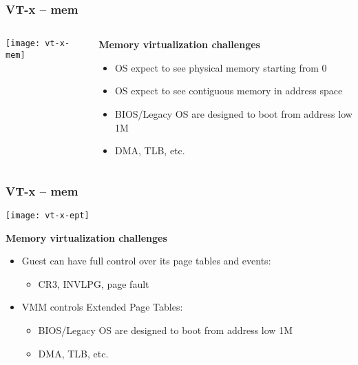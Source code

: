 \begin{frame}[plain]
	\frametitle{VT-x -- mem}
	
	
	
	\begin{columns}
		
		\begin{column}{.5\textwidth}
			
			\texttt{[image: vt-x-mem]}
			
		\end{column}
		
		\begin{column}{.5\textwidth}
			
			\textbf{Memory virtualization challenges}
			
			
			\begin{itemize}
				\item OS expect to see physical memory starting from 0
				\item OS expect to see contiguous memory in address space
				\item BIOS/Legacy OS are designed to boot from address low 1M
				\item DMA, TLB, etc.
			\end{itemize} 
			
			
			
		\end{column}
		
		
	\end{columns}
	
	
\end{frame}

\begin{frame}[plain]
	\frametitle{VT-x -- mem}
	
			
			\texttt{[image: vt-x-ept]}
		

			\textbf{Memory virtualization challenges}
			
			

			\begin{itemize}
				\item Guest can have full control over its page tables and events: 
				\begin{itemize}
				\item 	CR3, INVLPG, page fault
				\end{itemize}
				\item VMM controls Extended Page Tables:
				\begin{itemize}
				\item BIOS/Legacy OS are designed to boot from address low 1M
				\item DMA, TLB, etc.
				\end{itemize}
			\end{itemize} 
		
	
\end{frame}

